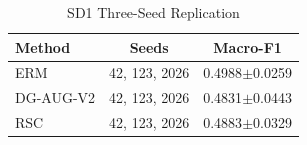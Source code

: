 
\begin{table}[t]
\centering
\caption{SD1 Three-Seed Replication}
\label{tab:sd1_multiseed}
\begin{tabular}{lcc}
\hline
Method & Seeds & Macro-F1 \\
\hline
ERM & 42, 123, 2026 & 0.4988$\pm$0.0259 \\
DG-AUG-V2 & 42, 123, 2026 & 0.4831$\pm$0.0443 \\
RSC & 42, 123, 2026 & 0.4883$\pm$0.0329 \\
\hline
\end{tabular}
\end{table}
